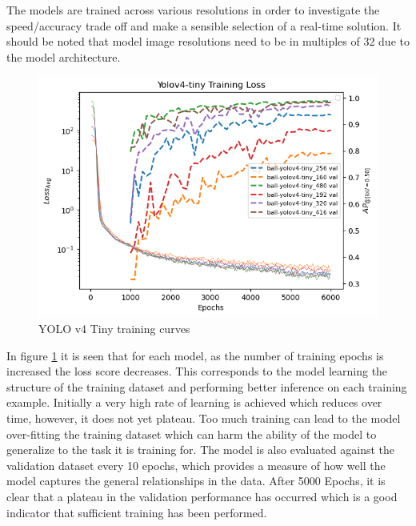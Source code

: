 \documentclass[a4paper,twoside,12pt]{report}
\begin{document}
The models are trained across various resolutions in order to investigate the speed/accuracy trade off and make a sensible selection of a real-time solution. It should be noted that model image resolutions need to be in multiples of 32 due to the model architecture.

\begin{figure}[h!]
\begin{center}
\includegraphics[width=13cm]{images/yolov4tiny_train.png}
\caption{YOLO v4 Tiny training curves}
\label{fig:yolov4tiny_train}
\end{center}
\end{figure}

In figure \ref{fig:yolov4tiny_train} it is seen that for each model, as the number of training epochs is increased the loss score decreases. This corresponds to the model learning the structure of the training dataset and performing better inference on each training example. Initially a very high rate of learning is achieved which reduces over time, however, it does not yet plateau. Too much training can lead to the model over-fitting the training dataset which can harm the ability of the model to generalize to the task it is training for. The model is also evaluated against the validation dataset every 10 epochs, which provides a measure of how well the model captures the general relationships in the data. After 5000 Epochs, it is clear that a plateau in the validation performance has occurred which is a good indicator that sufficient training has been performed. 
\end{document}
